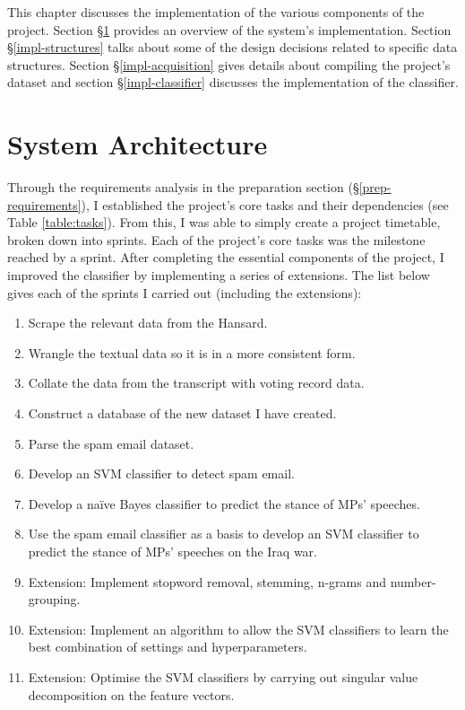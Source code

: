 \documentclass[12pt,a4paper,twoside,openright]{report}
\begin{document}
This chapter discusses the implementation of the various components of the project. Section \S\ref{impl-architecture} provides an overview of the system's implementation. Section \S\ref{impl-structures} talks about some of the design decisions related to specific data structures. Section \S\ref{impl-acquisition} gives details about compiling the project's dataset and section \S\ref{impl-classifier} discusses the implementation of the classifier.


\section{System Architecture} \label{impl-architecture}

Through the requirements analysis in the preparation section (\S\ref{prep-requirements}), I established the project's core tasks and their dependencies (see Table \ref{table:tasks}). From this, I was able to simply create a project timetable, broken down into sprints. Each of the project's core tasks was the milestone reached by a sprint. After completing the essential components of the project, I improved the classifier by implementing a series of extensions. The list below gives each of the sprints I carried out (including the extensions):

\begin{enumerate}
	\item Scrape the relevant data from the Hansard.
	\item Wrangle the textual data so it is in a more consistent form.
	\item Collate the data from the transcript with voting record data.
	\item Construct a database of the new dataset I have created.
	\item Parse the spam email dataset.
	\item Develop an SVM classifier to detect spam email.
	\item Develop a na\"{i}ve Bayes classifier to predict the stance of MPs' speeches.
	\item Use the spam email classifier as a basis to develop an SVM classifier to predict the stance of MPs' speeches on the Iraq war.
	\item Extension: Implement stopword removal, stemming, n-grams and number-grouping.
	\item Extension: Implement an algorithm to allow the SVM classifiers to learn the best combination of settings and hyperparameters.
	\item Extension: Optimise the SVM classifiers by carrying out singular value decomposition on the feature vectors.
\end{enumerate}
\end{document}
